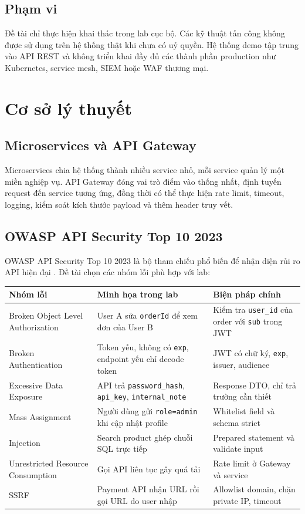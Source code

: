 \documentclass[12pt,a4paper]{report}
\begin{document}
\section{Phạm vi}
Đề tài chỉ thực hiện khai thác trong lab cục bộ. Các kỹ thuật tấn công không được sử dụng trên hệ thống thật khi chưa có uỷ quyền. Hệ thống demo tập trung vào API REST và không triển khai đầy đủ các thành phần production như Kubernetes, service mesh, SIEM hoặc WAF thương mại.

\chapter{Cơ sở lý thuyết}

\section{Microservices và API Gateway}
Microservices chia hệ thống thành nhiều service nhỏ, mỗi service quản lý một miền nghiệp vụ. API Gateway đóng vai trò điểm vào thống nhất, định tuyến request đến service tương ứng, đồng thời có thể thực hiện rate limit, timeout, logging, kiểm soát kích thước payload và thêm header truy vết.

\section{OWASP API Security Top 10 2023}
OWASP API Security Top 10 2023 là bộ tham chiếu phổ biến để nhận diện rủi ro API hiện đại \cite{owasp-api-2023}. Đề tài chọn các nhóm lỗi phù hợp với lab:

\begin{longtable}{p{4cm}p{5.2cm}p{5cm}}
\toprule
\textbf{Nhóm lỗi} & \textbf{Minh họa trong lab} & \textbf{Biện pháp chính}\\
\midrule
Broken Object Level Authorization & User A sửa \texttt{orderId} để xem đơn của User B & Kiểm tra \texttt{user\_id} của order với \texttt{sub} trong JWT\\
Broken Authentication & Token yếu, không có \texttt{exp}, endpoint yếu chỉ decode token & JWT có chữ ký, \texttt{exp}, issuer, audience\\
Excessive Data Exposure & API trả \texttt{password\_hash}, \texttt{api\_key}, \texttt{internal\_note} & Response DTO, chỉ trả trường cần thiết\\
Mass Assignment & Người dùng gửi \texttt{role=admin} khi cập nhật profile & Whitelist field và schema strict\\
Injection & Search product ghép chuỗi SQL trực tiếp & Prepared statement và validate input\\
Unrestricted Resource Consumption & Gọi API liên tục gây quá tải & Rate limit ở Gateway và service\\
SSRF & Payment API nhận URL rồi gọi URL do user nhập & Allowlist domain, chặn private IP, timeout\\
\bottomrule
\end{longtable}
\end{document}
